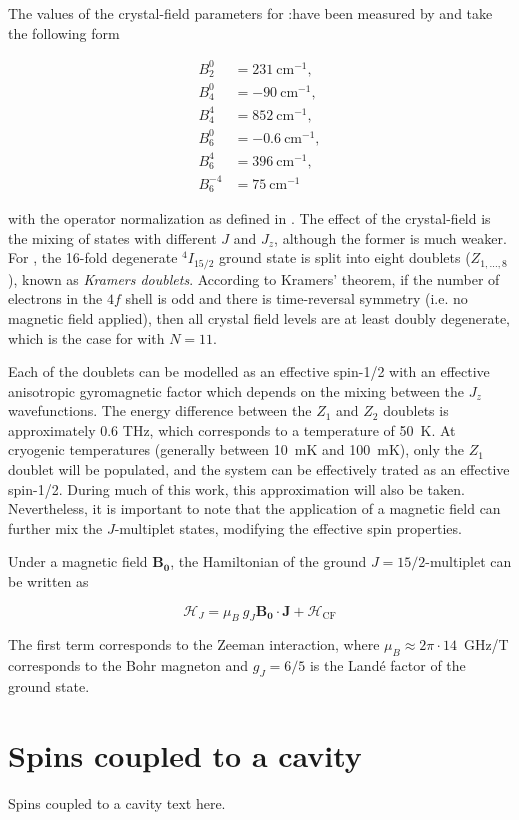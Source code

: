 The values of the crystal-field parameters for \Er:\Ca have been measured by \cite{enrique_optical_1971} and take the following form

\begin{align*}
    B_2^0 &= 231~\text{cm}^{-1}, \\
    B_4^0 &= -90~\text{cm}^{-1}, \\
    B_4^4 &= 852~\text{cm}^{-1}, \\
    B_6^0 &= -0.6~\text{cm}^{-1}, \\
    B_6^4 &= 396~\text{cm}^{-1}, \\
    B_6^{-4} &= 75~\text{cm}^{-1}
\end{align*}

with the operator normalization as defined in \cite{erath_crystal_1961}. The effect of the crystal-field is the mixing of states with different $J$ and $J_z$, although the former is much weaker. For \Er, the 16-fold degenerate $^4I_{15/2}$ ground state is split into eight doublets ($Z_{1,\dots,8}$), known as \emph{Kramers doublets}. According to Kramers' theorem, \cite{kramers_general_1930} if the number of electrons in the $4f$ shell is odd and there is time-reversal symmetry (i.e. no magnetic field applied), then all crystal field levels are at least doubly degenerate, which is the case for \Er with $N=11$.

Each of the doublets can be modelled as an effective spin-1/2 with an effective anisotropic gyromagnetic factor which depends on the mixing between the $J_z$ wavefunctions. The energy difference between the $Z_1$ and $Z_2$ doublets is approximately 0.6 THz, which corresponds to a temperature of 50~K. At cryogenic temperatures (generally between 10~mK and 100~mK), only the $Z_1$ doublet will be populated, and the system can be effectively trated as an effective spin-1/2. During much of this work, this approximation will also be taken.  Nevertheless, it is important to note that the application of a magnetic field can further mix the $J$-multiplet states, modifying the effective spin properties.

Under a magnetic field $\mathbf{B_0}$, the Hamiltonian of the ground $J=15/2$-multiplet can be written as 

\begin{equation}
    \mathcal{H}_J = \mu_B \ g_J\mathbf{B_0}\cdot \mathbf{J} + \mathcal{H}_{\mathrm{CF}}
\end{equation}

The first term corresponds to the Zeeman interaction, where $\mu_B\approx2\pi\cdot14$~GHz/T corresponds to the Bohr magneton and $g_J=6/5$ is the Landé factor of the \Er ground state.

\section{Spins coupled to a cavity}
Spins coupled to a cavity text here.